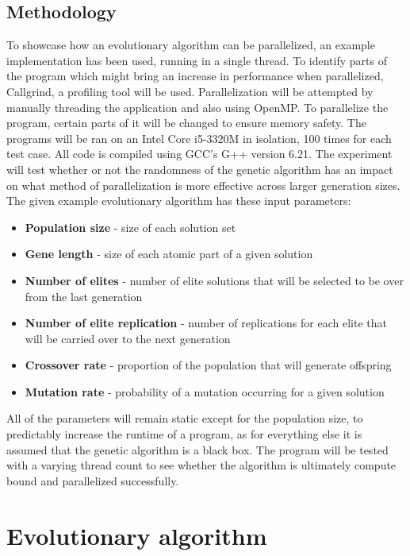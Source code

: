 \documentclass[journal,transmag]{IEEEtran}
\begin{document}
\subsection{Methodology}
        To showcase how an evolutionary algorithm can be parallelized, an example implementation
        has been used, running in a single thread. To identify parts of the program which might
        bring an increase in performance when parallelized, Callgrind, a profiling tool will be 
        used. Parallelization will be attempted by manually threading the application and also 
        using OpenMP. To parallelize the program, certain parts of it will be changed to ensure
        memory safety. The programs will be ran on an Intel Core i5-3320M in isolation, 100 times
        for each test case. All code is compiled using GCC's G++ version 6.21. The experiment will
        test whether or not the randomness of the genetic algorithm has an impact on what method
        of parallelization is more effective across larger generation sizes.
        The given example evolutionary algorithm has these input parameters:
        \begin{itemize}
            \item \textbf{Population size} - size of each solution set
            \item \textbf{Gene length} - size of each atomic part of a given solution
            \item \textbf{Number of elites} - number of elite solutions that will be selected to be over from the last generation
            \item \textbf{Number of elite replication} - number of replications for each elite that will be carried over to the next generation
            \item \textbf{Crossover rate} - proportion of the population that will generate offspring
            \item \textbf{Mutation rate} - probability of a mutation occurring for a given solution
        \end{itemize}
        All of the parameters will remain static except for the population size,  to predictably
        increase the runtime of a program, as for everything else it is assumed that the genetic 
        algorithm is a black box. The program will be tested with a varying thread count to 
        see whether the algorithm is ultimately compute bound and parallelized successfully.


\section{Evolutionary algorithm}
\end{document}

